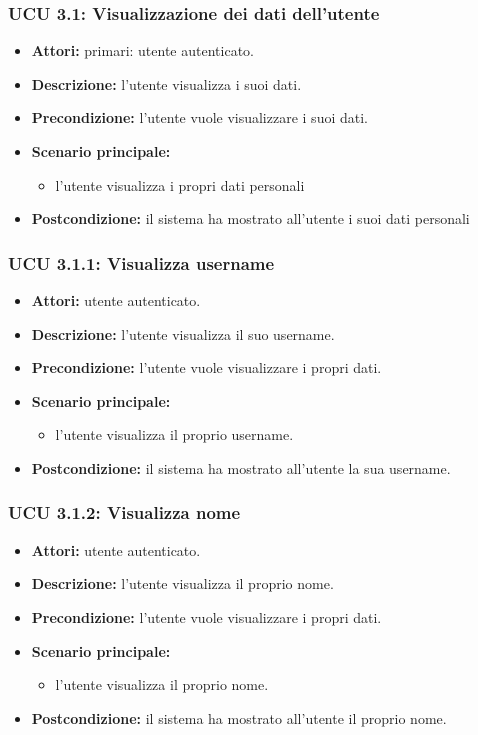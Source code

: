 \subsubsection{UCU 3.1: Visualizzazione dei dati dell'utente}
\begin{itemize}
	\item \textbf{Attori: } primari: utente autenticato.
	\item \textbf{Descrizione: } l'utente visualizza i suoi dati.
	\item \textbf{Precondizione: } l'utente vuole visualizzare i suoi dati.
	\item \textbf{Scenario principale:}
	\begin{itemize}
		\item l'utente visualizza i propri dati personali
	\end{itemize}
	\item \textbf{Postcondizione:} il sistema ha mostrato all'utente i suoi dati personali
\end{itemize}

\subsubsection{UCU 3.1.1: Visualizza username}
\begin{itemize}
	\item \textbf{Attori: } utente autenticato.
	\item \textbf{Descrizione: } l'utente visualizza il suo username.
	\item \textbf{Precondizione: } l'utente vuole visualizzare i propri dati.
	\item \textbf{Scenario principale:}
	\begin{itemize}
		\item l'utente visualizza il proprio username.
	\end{itemize}
\item \textbf{Postcondizione:} il sistema ha mostrato all'utente la sua username.
\end{itemize}

\subsubsection{UCU 3.1.2: Visualizza nome}
\begin{itemize}
	\item \textbf{Attori: } utente autenticato.
	\item \textbf{Descrizione: } l'utente visualizza il proprio nome.
	\item \textbf{Precondizione: } l'utente vuole visualizzare i propri dati.
	\item \textbf{Scenario principale:}
	\begin{itemize}
		\item l'utente visualizza il proprio nome.
	\end{itemize}
	\item \textbf{Postcondizione:} il sistema ha mostrato all'utente il proprio nome.
\end{itemize}

